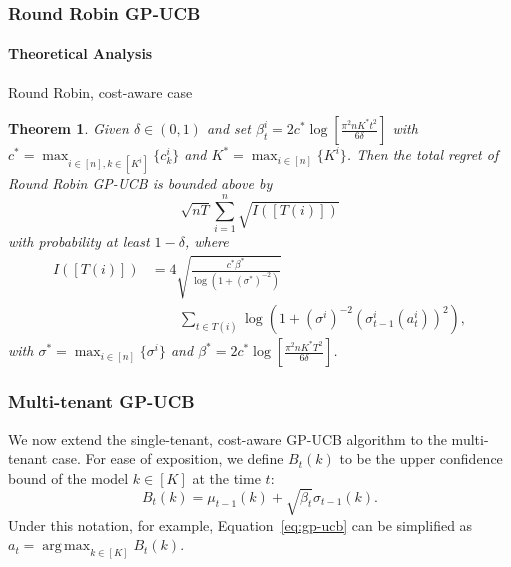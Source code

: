 \documentclass[letterpaper]{vldb}
\newtheorem{theorem}{Theorem}
\DeclareMathOperator*{\argmax}{arg\,max}
\begin{document}
\subsubsection{Round Robin GP-UCB}



\paragraph*{Theoretical Analysis}

{\color{red} Round Robin, cost-aware case}

\begin{theorem}
  \label{thm:rr}
  Given $\delta\in (0,1)$ and set $\beta_t^i = 2c^\ast \log\left[\frac{\pi^2 n K^\ast t^2}{6\delta}\right]$ with $c^\ast = \max_{i\in [n], k\in [K^i]}\{c^i_k\}$ and $K^\ast = \max_{i\in [n]}\{K^i\}$. Then the
  total regret of Round Robin GP-UCB is bounded above by
  \[
     \sqrt{n T}\sum_{i=1}^n \sqrt{I([T(i)])}
  \]
  with probability at least $1-\delta$,
  where
  \begin{align*}
    I([T(i)]) & = 4 \sqrt{\frac{c^\ast \beta^\ast}{\log(1 + (\sigma^\ast)^{-2})}}\\
    &\qquad \sum_{t\in T(i)} \log\left(1 + (\sigma^i)^{-2}(\sigma^i_{t-1}(a^i_{t}))^2\right),
  \end{align*}
  with $\sigma^\ast= \max_{i\in [n]}\{\sigma^i\}$ and $\beta^\ast = 2c^\ast \log\left[\frac{\pi^2 n K^\ast T^2}{6\delta}\right]$.
\end{theorem}



\newpage

\subsubsection{Multi-tenant GP-UCB}

We now extend the single-tenant, cost-aware GP-UCB algorithm to the multi-tenant case.
For ease of exposition, we define $B_t(k)$ to be the upper confidence bound of the model $k\in[K]$ at the time $t$: %
\begin{equation}
B_t(k)=\mu_{t-1}(k) + \sqrt{\beta_t}\sigma_{t-1}(k).
\end{equation}
Under this notation, for example, Equation~\ref{eq:gp-ucb} can be simplified as $a_t=\argmax_{k\in [K]} B_t(k)$.

\end{document}
